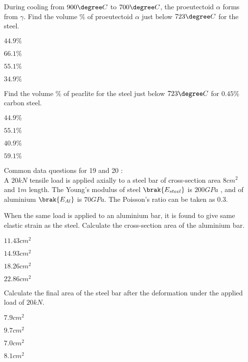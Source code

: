 \item %
During cooling from $900 \degree C$ to $700 \degree C$, the proeutectoid $\alpha$ forms from $\gamma$. Find the volume \% of proeutectoid $\alpha $ just below $723 \degree C$ for the steel.
\begin{enumerate}
\begin{multicols}{4}
\item $44.9 \%$
\item $66.1 \%$
\item $55.1 \%$
\item $34.9 \%$
\end{multicols}
\end{enumerate}
\item %
Find the volume \% of pearlite for the steel just below $723 \degree C$ for $0.45 \%$ carbon steel.
\begin{enumerate}
\begin{multicols}{4}
\item $44.9 \%$
\item $55.1 \%$
\item $40.9 \%$
\item $59.1\%$
\end{multicols}
\end{enumerate}
Common data questions for 19 and 20 :\\
A $20kN$ tensile load is applied axially to a steel bar of cross-section area $8 cm^2$ and $1m$ length. The Young's modulus of steel $\brak{E_{steel}}$ is $200GPa$ , and of aluminium $\brak{E_{Al}}$ is $70 GPa$. The Poisson's ratio  can be taken as 0.3.
\item %
When the same load is applied to an aluminium bar, it is found to give same elastic strain as the steel. Calculate the cross-section area of the aluminium bar.
\begin{enumerate}
\begin{multicols}{4}
\item $11.43 cm^2$
\item $14.93 cm^2$
\item $18.26 cm^2$
\item $22.86 cm^2$
\end{multicols}
\end{enumerate}
\item %
Calculate the final area of the steel bar after the deformation under the applied load of $20kN$.
\begin{enumerate}
\begin{multicols}{4}
\item $7.9 cm^2$
\item $9.7 cm^2$
\item $7.0 cm^2$
\item $8.1 cm^2$
\end{multicols}
\end{enumerate}
